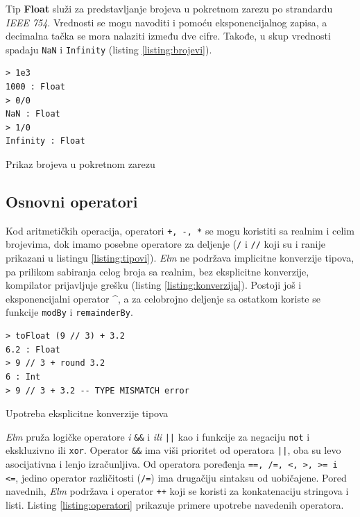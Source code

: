 \documentclass[12pt,oneside]{memoir}
\begin{document}
Tip \textbf{Float} služi za predstavljanje brojeva u pokretnom zarezu po strandardu
\emph{IEEE 754}. Vrednosti se mogu navoditi i pomoću eksponencijalnog zapisa, a decimalna 
tačka se mora nalaziti između dve cifre. Takođe, u skup vrednosti spadaju \texttt{NaN} i
\texttt{Infinity} (listing \ref{listing:brojevi}).

\begin{listing}[ht]
\begin{verbatim}
> 1e3
1000 : Float
> 0/0 
NaN : Float
> 1/0 
Infinity : Float
\end{verbatim}
\caption{Prikaz brojeva u pokretnom zarezu}
\label{listing:brojevi}
\end{listing}


\subsection{Osnovni operatori}
Kod aritmetičkih operacija, operatori \texttt{+, -, *} se mogu koristiti sa realnim i 
celim brojevima, dok imamo posebne operatore za deljenje (\texttt{{/}} i \texttt{{//}} koji
su i ranije prikazani u listingu \ref{listing:tipovi}). \emph{Elm} ne podržava implicitne konverzije
tipova, pa prilikom sabiranja celog broja sa realnim, bez eksplicitne konverzije, kompilator
prijavljuje grešku (listing \ref{listing:konverzija}). Postoji još i eksponencijalni operator \^{},
a za celobrojno deljenje sa ostatkom koriste se funkcije \texttt{modBy} i \texttt{remainderBy}.
\begin{listing}[h]
\begin{verbatim}
> toFloat (9 // 3) + 3.2
6.2 : Float
> 9 // 3 + round 3.2
6 : Int
> 9 // 3 + 3.2 -- TYPE MISMATCH error
\end{verbatim}
\caption{Upotreba eksplicitne konverzije tipova}
\label{listing:konverzija}
\end{listing}

\emph{Elm} pruža logičke operatore \emph{i} \texttt{\&\&} i  \emph{ili} \texttt{||} kao i funkcije za negaciju 
\texttt{not} i ekskluzivno ili \texttt{xor}. Operator \texttt{\&\&} ima viši prioritet 
od operatora \texttt{||}, oba su levo asocijativna i lenjo izračunljiva. Od operatora poređenja 
\texttt{==, /=, <, >, >= i <=}, jedino operator različitosti (\texttt{/=}) ima drugačiju
sintaksu od uobičajene. Pored navednih, \emph{Elm} podržava i operator \texttt{++} koji se koristi za
konkatenaciju stringova i listi. Listing \ref{listing:operatori} prikazuje primere upotrebe 
navedenih operatora.
\end{document}

